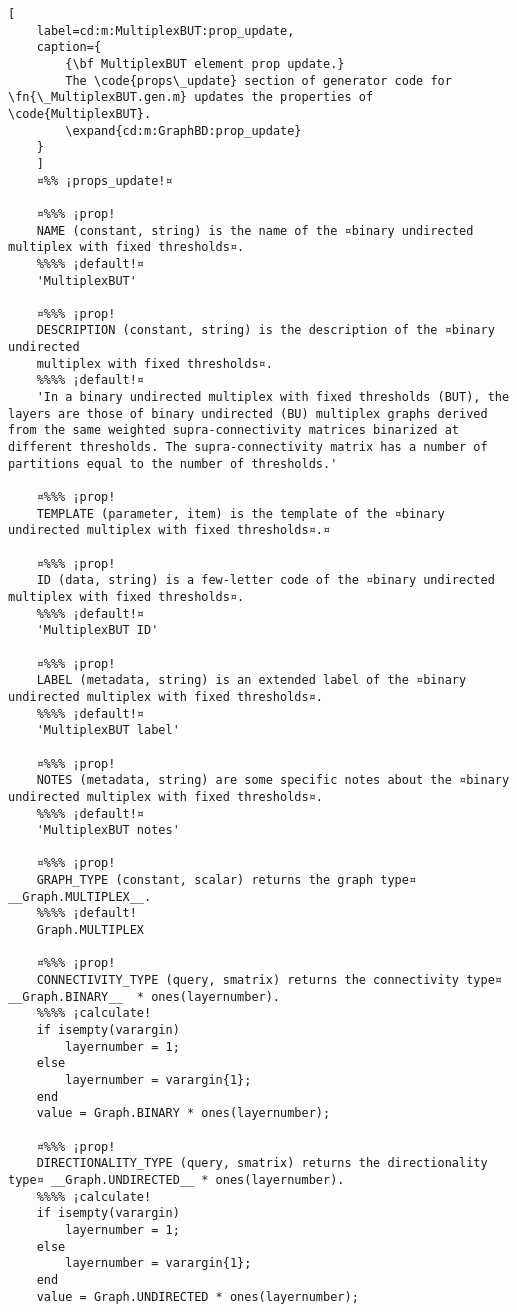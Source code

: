 \documentclass{tufte-handout}
\begin{document}
\begin{lstlisting}[
	label=cd:m:MultiplexBUT:prop_update,
	caption={
		{\bf MultiplexBUT element prop update.}
		The \code{props\_update} section of generator code for \fn{\_MultiplexBUT.gen.m} updates the properties of \code{MultiplexBUT}.
		\expand{cd:m:GraphBD:prop_update}
	}
	]
	¤%% ¡props_update!¤
	
	¤%%% ¡prop!
	NAME (constant, string) is the name of the ¤binary undirected multiplex with fixed thresholds¤.
	%%%% ¡default!¤
	'MultiplexBUT'
	
	¤%%% ¡prop!
	DESCRIPTION (constant, string) is the description of the ¤binary undirected
	multiplex with fixed thresholds¤.
	%%%% ¡default!¤
	'In a binary undirected multiplex with fixed thresholds (BUT), the layers are those of binary undirected (BU) multiplex graphs derived from the same weighted supra-connectivity matrices binarized at different thresholds. The supra-connectivity matrix has a number of partitions equal to the number of thresholds.'

	¤%%% ¡prop!
	TEMPLATE (parameter, item) is the template of the ¤binary undirected multiplex with fixed thresholds¤.¤
	
	¤%%% ¡prop!
	ID (data, string) is a few-letter code of the ¤binary undirected multiplex with fixed thresholds¤.
	%%%% ¡default!¤
	'MultiplexBUT ID'
	
	¤%%% ¡prop!
	LABEL (metadata, string) is an extended label of the ¤binary undirected multiplex with fixed thresholds¤.
	%%%% ¡default!¤
	'MultiplexBUT label'
	
	¤%%% ¡prop!
	NOTES (metadata, string) are some specific notes about the ¤binary undirected multiplex with fixed thresholds¤.
	%%%% ¡default!¤
	'MultiplexBUT notes'
	
	¤%%% ¡prop!
	GRAPH_TYPE (constant, scalar) returns the graph type¤ __Graph.MULTIPLEX__.
	%%%% ¡default!
	Graph.MULTIPLEX
	
	¤%%% ¡prop!
	CONNECTIVITY_TYPE (query, smatrix) returns the connectivity type¤ __Graph.BINARY__  * ones(layernumber).
	%%%% ¡calculate!
	if isempty(varargin)
		layernumber = 1;
	else
		layernumber = varargin{1};
	end
	value = Graph.BINARY * ones(layernumber); 
	
	¤%%% ¡prop!
	DIRECTIONALITY_TYPE (query, smatrix) returns the directionality type¤ __Graph.UNDIRECTED__ * ones(layernumber).
	%%%% ¡calculate!
	if isempty(varargin)
		layernumber = 1;
	else
		layernumber = varargin{1};
	end
	value = Graph.UNDIRECTED * ones(layernumber);
	

\end{lstlisting}
\end{document}
